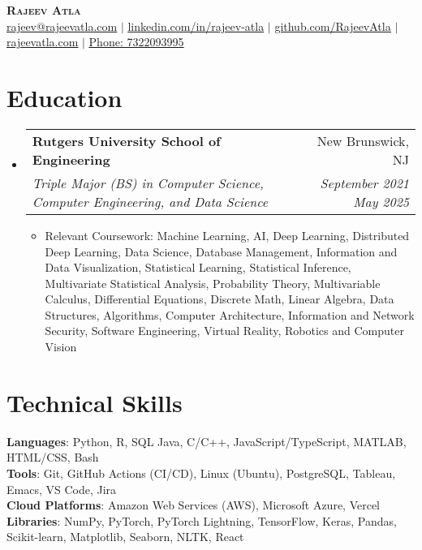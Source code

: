 \documentclass[letterpaper, 11pt]{article}
\makeatletter
\newcommand{\resumeSubheading}[4]{ %
  \vspace{-2pt}\item
    \begin{tabular*}{0.99\textwidth}[t]{l@{\extracolsep{\fill}}r}
      \textbf{#1} & #2 \\
      \textit{\small#3} & \textit{\small #4} \\
    \end{tabular*}\vspace{-7pt}
}
\newcommand{\resumeSubHeadingListStart}{\begin{itemize}[leftmargin=0.15in, label={}]}
\newcommand{\resumeSubHeadingListEnd}{\end{itemize}}
\makeatother
\begin{document}


\begin{center}
    \textbf{\Huge \scshape Rajeev Atla} \\
    \href{mailto:rajeev@rajeevatla.com}{\underline{rajeev@rajeevatla.com}} $|$ 
    \href{https://www.linkedin.com/in/rajeev-atla/}{\underline{linkedin.com/in/rajeev-atla}} $|$
    \href{https://github.com/RajeevAtla}{\underline{github.com/RajeevAtla}} $|$
    \href{https://rajeevatla.com}{\underline{rajeevatla.com}} $|$
    \href{tel:7322093995}{\underline{Phone: 7322093995}}
\end{center}


\section{Education}
  \resumeSubHeadingListStart{}
    \resumeSubheading %
      {Rutgers University \textendash{} School of Engineering}{New Brunswick, NJ}
      {Triple Major (BS) in Computer Science, Computer Engineering, and Data Science}{September 2021 \textendash{} May 2025}
      \begin{itemize}[leftmargin=0.25in, label={}]
      \item Relevant Coursework: Machine Learning, AI, Deep Learning, Distributed Deep Learning, Data Science, Database Management, Information and Data Visualization, Statistical Learning, Statistical Inference, Multivariate Statistical Analysis, Probability Theory, Multivariable Calculus, Differential Equations, Discrete Math, Linear Algebra, Data Structures, Algorithms, Computer Architecture, Information and Network Security, Software Engineering, Virtual Reality, Robotics and Computer Vision \\
\end{itemize}
  \resumeSubHeadingListEnd{}

\vspace{-35pt}

\section{Technical Skills}
 \begin{itemize}[leftmargin=0.25in, label={}]
    \small{\item{
     \textbf{Languages}{: Python, R, SQL Java, C/C++, JavaScript/TypeScript, MATLAB, HTML/CSS, Bash} \\
     \textbf{Tools}{: Git, GitHub Actions (CI/CD), Linux (Ubuntu), PostgreSQL, Tableau, Emacs, VS Code, Jira} \\
     \textbf{Cloud Platforms}{: Amazon Web Services (AWS), Microsoft Azure, Vercel}\\
     \textbf{Libraries}{: NumPy, PyTorch, PyTorch Lightning, TensorFlow, Keras, Pandas, Scikit-learn, Matplotlib, Seaborn, NLTK, React}
    }}
 \end{itemize}
\end{document}

